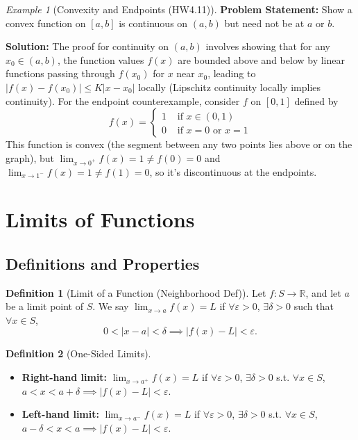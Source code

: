 \documentclass{article}
\theoremstyle{definition}
\newtheorem{definition}{Definition}[section]
\theoremstyle{plain}
\theoremstyle{remark}
\newtheorem{example}{Example}[section]
\newcommand{\R}{\mathbb{R}}
\newcommand{\eps}{\varepsilon}
\begin{document}
\begin{example}[Convexity and Endpoints (HW4.11)]
\textbf{Problem Statement:} Show a convex function on \([a,b]\) is continuous on \((a,b)\) but need not be at \(a\) or \(b\).

\textbf{Solution:} The proof for continuity on \((a,b)\) involves showing that for any \(x_0 \in (a,b)\), the function values \(f(x)\) are bounded above and below by linear functions passing through \(f(x_0)\) for \(x\) near \(x_0\), leading to \(|f(x)-f(x_0)| \le K|x-x_0|\) locally (Lipschitz continuity locally implies continuity).
For the endpoint counterexample, consider \(f\) on \([0, 1]\) defined by
\[ f(x) = \begin{cases} 1 & \text{ if } x \in (0, 1) \\ 0 & \text{ if } x = 0 \text{ or } x = 1 \end{cases} \]
This function is convex (the segment between any two points lies above or on the graph), but \(\lim_{x\to 0^+} f(x) = 1 \ne f(0)=0\) and \(\lim_{x\to 1^-} f(x) = 1 \ne f(1)=0\), so it's discontinuous at the endpoints.
\end{example}

\section{Limits of Functions}

\subsection{Definitions and Properties}

\begin{definition}[Limit of a Function (Neighborhood Def){\cite[Def 20.1]{Ross}}]
Let \(f: S \to \R\), and let \(a\) be a limit point of \(S\). We say \(\lim_{x\to a} f(x) = L\) if \(\forall \eps > 0\), \(\exists \delta > 0\) such that \(\forall x \in S\),
\[ 0 < |x-a| < \delta \implies |f(x) - L| < \eps. \]
\end{definition}

\begin{definition}[One-Sided Limits{\cite[Def 20.8]{Ross}}]
\begin{itemize}
    \item \textbf{Right-hand limit:} \(\lim_{x\to a^+} f(x) = L\) if \(\forall \eps > 0\), \(\exists \delta > 0\) s.t. \(\forall x \in S\), \( a < x < a+\delta \implies |f(x) - L| < \eps \).
    \item \textbf{Left-hand limit:} \(\lim_{x\to a^-} f(x) = L\) if \(\forall \eps > 0\), \(\exists \delta > 0\) s.t. \(\forall x \in S\), \( a-\delta < x < a \implies |f(x) - L| < \eps \).
\end{itemize}
\end{definition}
\end{document}
